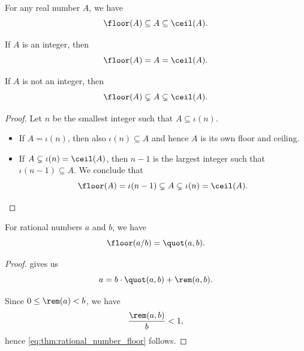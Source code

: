 \begin{proposition}\label{thm:real_floor_ceiling_interval}
  For any real number \( A \), we have
  \begin{equation*}
    \floor(A) \subseteq A \subseteq \ceil(A).
  \end{equation*}

  \begin{thmenum}
     If \( A \) is an integer, then
    \begin{equation*}
      \floor(A) = A = \ceil(A).
    \end{equation*}

     If \( A \) is not an integer, then
    \begin{equation*}
      \floor(A) \subsetneq A \subsetneq \ceil(A).
    \end{equation*}
  \end{thmenum}
\end{proposition}
\begin{proof}
  Let \( n \) be the smallest integer such that \( A \subseteq \iota(n) \).
  \begin{itemize}
    \item If \( A = \iota(n) \), then also \( \iota(n) \subseteq A \) and hence \( A \) is its own floor and ceiling.
    \item If \( A \subsetneq \iota(n) = \ceil(A) \), then \( n - 1 \) is the largest integer such that \( \iota(n - 1) \subseteq A \). We conclude that
    \begin{equation*}
      \floor(A) = \iota(n - 1) \subsetneq A \subsetneq \iota(n) = \ceil(A).
    \end{equation*}
  \end{itemize}
\end{proof}

\begin{proposition}\label{thm:rational_number_floor}
  For rational numbers \( a \) and \( b \), we have
  \begin{equation}\label{eq:thm:rational_number_floor}
    \floor(a / b) = \quot(a, b).
  \end{equation}
\end{proposition}
\begin{proof}
   gives us
  \begin{equation*}
    a = b \cdot \quot(a, b) + \rem(a, b).
  \end{equation*}

  Since \( 0 \leq \rem(a) < b \), we have
  \begin{equation*}
    \frac {\rem(a, b)} b < 1,
  \end{equation*}
  hence \eqref{eq:thm:rational_number_floor} follows.
\end{proof}

